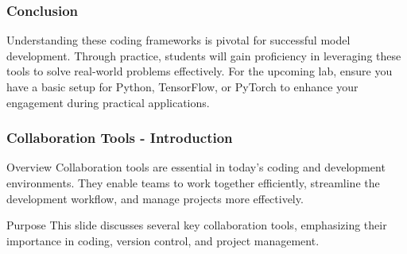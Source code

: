 \documentclass[aspectratio=169]{beamer}
\begin{document}
\begin{frame}
    \frametitle{Conclusion}
    Understanding these coding frameworks is pivotal for successful model development. 
    Through practice, students will gain proficiency in leveraging these tools to solve real-world problems effectively. 
    For the upcoming lab, ensure you have a basic setup for Python, TensorFlow, or PyTorch to enhance your engagement during practical applications.
\end{frame}

\begin{frame}[fragile]
    \frametitle{Collaboration Tools - Introduction}
    \begin{block}{Overview}
        Collaboration tools are essential in today’s coding and development environments. They enable teams to work together efficiently, streamline the development workflow, and manage projects more effectively.
    \end{block}
    \begin{block}{Purpose}
        This slide discusses several key collaboration tools, emphasizing their importance in coding, version control, and project management.
    \end{block}
\end{frame}
\end{document}
